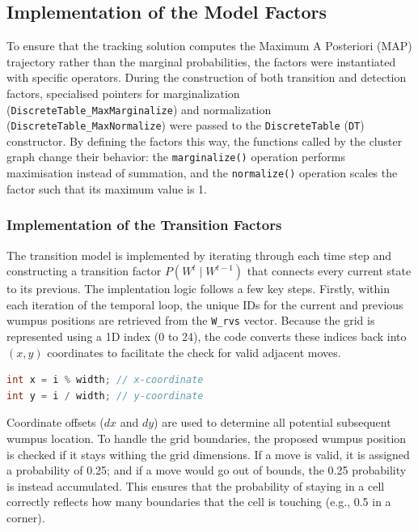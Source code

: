 \documentclass[10pt]{article}
\begin{document}
\subsection{Implementation of the Model Factors}
To ensure that the tracking solution computes the Maximum A Posteriori (MAP) trajectory rather than the marginal probabilities, the factors were instantiated with specific operators.
During the construction of both transition and detection factors, specialised pointers for marginalization (\texttt{DiscreteTable\_MaxMarginalize}) and normalization (\texttt{DiscreteTable\_MaxNormalize}) were passed to the \texttt{DiscreteTable} (\texttt{DT}) constructor.
By defining the factors this way, the functions called by the cluster graph change their behavior: the \texttt{marginalize()} operation performs maximisation instead of summation, and the \texttt{normalize()} operation scales the factor such that its maximum value is 1. 

\subsubsection{Implementation of the Transition Factors}
The transition model is implemented by iterating through each time step and constructing a transition factor $P(W^t \mid W^{t-1})$ 
that connects every current state to its previous. The implentation logic follows a few key steps. Firstly, within each iteration of the temporal loop, 
the unique IDs for the current and previous wumpus positions are retrieved from the \texttt{W\_rvs} vector. Because the grid is 
represented using a 1D index (0 to 24), the code converts these indices back into $(x, y)$ coordinates to facilitate the check for valid adjacent moves. 

\begin{lstlisting}[language=C++, caption={Conversion of grid indices to $(x, y)$ coordinates}, label={lst:coordconv}]
int x = i % width; // x-coordinate
int y = i / width; // y-coordinate
\end{lstlisting}

Coordinate offsets ($dx$ and $dy$) are used to determine all potential subsequent wumpus location. To handle the grid boundaries, 
the proposed wumpus position is checked if it stays withing the grid dimensions. If a move is valid, it is assigned a probability of 0.25; and if a move 
would go out of bounds, the 0.25 probability is instead accumulated. This ensures that the probability of staying in a cell correctly reflects how many boundaries that 
the cell is touching (e.g., 0.5 in a corner).
\end{document}
